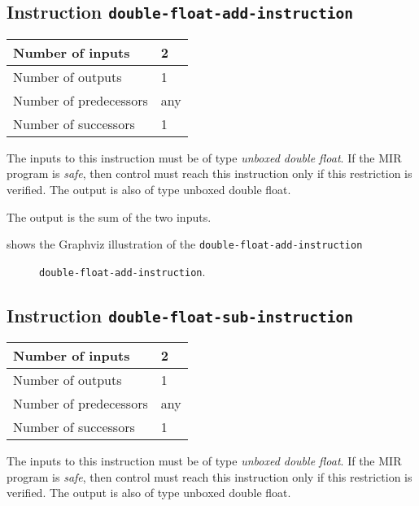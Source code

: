 \subsection{Instruction \texttt{double-float-add-instruction}}
\label{mir-instruction-double-float-add}

\begin{tabular}{|l|l|}
\hline
Number of inputs & 2\\
\hline
Number of outputs & 1\\
\hline
Number of predecessors & any\\
\hline
Number of successors & 1\\
\hline
\end{tabular}

The inputs to this instruction must be of type \emph{unboxed double
  float}.  If the MIR program is \emph{safe}, then control must reach
this instruction only if this restriction is verified.  The output is
also of type unboxed double float.

The output is the sum of the two inputs.

 shows the Graphviz illustration of the
\texttt{double-float-add-instruction}

\begin{figure}
\begin{center}
\end{center}
\caption{\label{fig-double-float-add-instruction}
\texttt{double-float-add-instruction}.}
\end{figure}

\subsection{Instruction \texttt{double-float-sub-instruction}}
\label{mir-instruction-double-float-sub}

\begin{tabular}{|l|l|}
\hline
Number of inputs & 2\\
\hline
Number of outputs & 1\\
\hline
Number of predecessors & any\\
\hline
Number of successors & 1\\
\hline
\end{tabular}

The inputs to this instruction must be of type \emph{unboxed double
  float}.  If the MIR program is \emph{safe}, then control must reach
this instruction only if this restriction is verified.  The output is
also of type unboxed double float.

